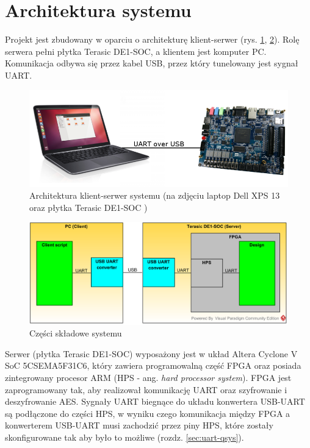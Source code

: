 \section{Architektura systemu}
\label{sec:architektura-systemu}
Projekt jest zbudowany w oparciu o architekturę klient-serwer (rys. \ref{fig:system-architecture-basic}, \ref{fig:system-architecture}). Rolę serwera pełni płytka Terasic DE1-SOC, a klientem jest komputer PC. Komunikacja odbywa się przez kabel USB, przez który tunelowany jest sygnał UART.

\begin{figure}[!h]
\centering
\includegraphics[width=6in]{pictures/system-architecture-basic.png}
\caption{Architektura klient-serwer systemu (na zdjęciu laptop Dell XPS 13 \cite{laptop} oraz płytka Terasic DE1-SOC \cite{plytka})}
\label{fig:system-architecture-basic}
\end{figure}

\begin{figure}[!h]
\centering
\includegraphics{pictures/system-architecture.png}
\caption{Części składowe systemu}
\label{fig:system-architecture}
\end{figure}

Serwer (płytka Terasic DE1-SOC) wyposażony jest w układ Altera Cyclone V SoC 5CSEMA5F31C6, który zawiera programowalną część FPGA oraz posiada zintegrowany procesor ARM (HPS - ang. \textit{hard processor system}). FPGA jest zaprogramowany tak, aby realizował komunikację UART oraz szyfrowanie i deszyfrowanie AES. Sygnały UART biegnące do układu konwertera USB-UART są podłączone do części HPS, w wyniku czego komunikacja między FPGA a konwerterem USB-UART musi zachodzić przez piny HPS, które zostały skonfigurowane tak aby było to możliwe (rozdz. \ref{sec:uart-qsys}).

